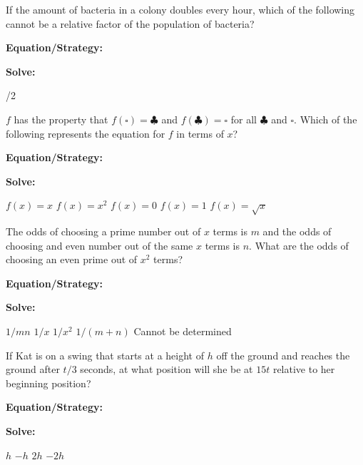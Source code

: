 \vfill
\newpage
\begin{multicols*}{2}
\begin{outline}[enumerate]
\medium

\1 If the amount of bacteria in a colony doubles every hour, which of the following cannot be a relative factor of the population of bacteria?

\bigskip
\textbf{Equation/Strategy:} \hrulefill

\bigskip
\textbf{Solve:}

\vfill
{}/2

\midline

\1 $f$ has the property that $f(\square)=\clubsuit$ and $f(\clubsuit)=\square$ for all $\clubsuit$ and $\square$. Which of the following represents the equation for $f$ in terms of $x$?

\bigskip
\textbf{Equation/Strategy:} \hrulefill

\bigskip
\textbf{Solve:}

\vfill
\2 $f(x)=x$
\2 $f(x)=x^2$
\2 $f(x)=0$
\2 $f(x)=1$
\2 $f(x)=\sqrt{x}$

\columnbreak
\advanced

\1 The odds of choosing a prime number out of $x$ terms is $m$ and the odds of choosing and even number out of the same $x$ terms is $n$. What are the odds of choosing an even prime out of $x^2$ terms?

\bigskip
\textbf{Equation/Strategy:} \hrulefill

\bigskip
\textbf{Solve:}

\vfill
\2 $1/mn$
\2 $1/x$
\2 $1/x^2$
\2 $1/(m+n)$
\2 Cannot be determined

\midline

\1 If Kat is on a swing that starts at a height of $h$ off the ground and reaches the ground after $t/3$ seconds, at what position will she be at $15t$ relative to her beginning position?

\bigskip
\textbf{Equation/Strategy:} \hrulefill

\bigskip
\textbf{Solve:}

\vfill
\2 $h$
\2 $-h$
\2 $2h$
\2 $-2h$
\end{outline}
\end{multicols*}